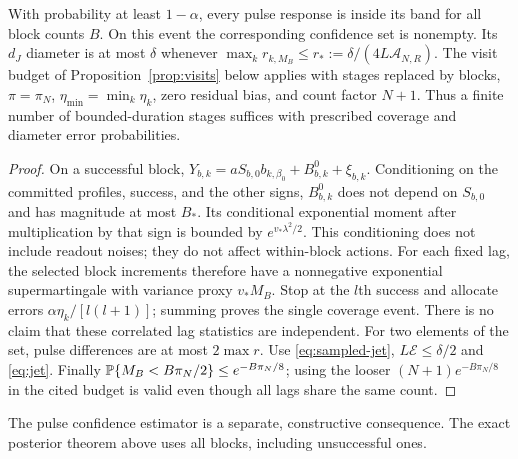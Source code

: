 \begin{proposition}
\label{prop:pulse-confidence}
With probability at least $1-\alpha$, every pulse response is inside its band
for all block counts $B$. On this event the corresponding confidence set is
nonempty. Its $d_J$ diameter is at most $\delta$ whenever
$\max_k r_{k,M_B}\le r_*:=\delta/(4L\mathcal A_{N,R})$.
The visit budget of Proposition~\ref{prop:visits} below applies with stages
replaced by blocks, $\pi=\pi_N$, $\eta_{\min}=\min_k\eta_k$, zero residual
bias, and count factor $N+1$. Thus a finite number of bounded-duration stages
suffices with prescribed coverage and diameter error probabilities.
\end{proposition}
\begin{proof}
On a successful block,
$Y_{b,k}=aS_{b,0}b_{k,\beta_0}+B_{b,k}^0+\xi_{b,k}$.
Conditioning on the committed profiles, success, and the other signs,
$B_{b,k}^0$ does not depend on $S_{b,0}$ and has magnitude at most $B_*$.
Its conditional exponential moment after multiplication by that sign is
bounded by $e^{v_*\lambda^2/2}$. This conditioning does not include readout
noises; they do not affect within-block actions. For each fixed lag, the
selected block increments therefore have a nonnegative exponential
supermartingale with variance proxy $v_*M_B$. Stop at the $l$th success and
allocate errors $\alpha\eta_k/[l(l+1)]$; summing proves the single coverage
event. There is no claim that these correlated lag statistics are independent.
For two elements of the set, pulse differences are at most $2\max r$.
Use \eqref{eq:sampled-jet}, $L\mathcal E\le\delta/2$ and \eqref{eq:jet}.
Finally $\mathbb P\{M_B<B\pi_N/2\}\le e^{-B\pi_N/8}$; using the looser
$(N+1)e^{-B\pi_N/8}$ in the cited budget is valid even though all lags
share the same count.
\end{proof}
The pulse confidence estimator is a separate, constructive consequence.
The exact posterior theorem above uses all blocks, including unsuccessful ones.

